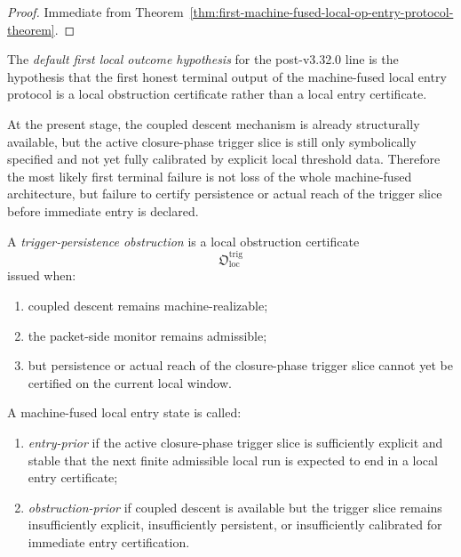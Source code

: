 \begin{proof}
Immediate from Theorem~\ref{thm:first-machine-fused-local-op-entry-protocol-theorem}.
\end{proof}



\begin{definition}
\label{def:default-first-local-outcome-hypothesis}
The \emph{default first local outcome hypothesis} for the post-v3.32.0 line is the hypothesis that the first honest terminal output of the machine-fused local entry protocol is a local obstruction certificate rather than a local entry certificate.
\end{definition}

\begin{remark}
\label{rem:why-obstruction-is-the-current-default}
At the present stage, the coupled descent mechanism is already structurally available, but the active closure-phase trigger slice is still only symbolically specified and not yet fully calibrated by explicit local threshold data. Therefore the most likely first terminal failure is not loss of the whole machine-fused architecture, but failure to certify persistence or actual reach of the trigger slice before immediate entry is declared.
\end{remark}

\begin{definition}
\label{def:trigger-persistence-obstruction}
A \emph{trigger-persistence obstruction} is a local obstruction certificate
\[
\mathfrak{O}_{\mathrm{loc}}^{\mathrm{trig}}
\]
issued when:
\begin{enumerate}
    \item coupled descent remains machine-realizable;
    \item the packet-side monitor remains admissible;
    \item but persistence or actual reach of the closure-phase trigger slice cannot yet be certified on the current local window.
\end{enumerate}
\end{definition}

\begin{definition}
\label{def:entry-prior-versus-obstruction-prior-local-regime}
A machine-fused local entry state is called:
\begin{enumerate}
    \item \emph{entry-prior} if the active closure-phase trigger slice is sufficiently explicit and stable that the next finite admissible local run is expected to end in a local entry certificate;
    \item \emph{obstruction-prior} if coupled descent is available but the trigger slice remains insufficiently explicit, insufficiently persistent, or insufficiently calibrated for immediate entry certification.
\end{enumerate}
\end{definition}

